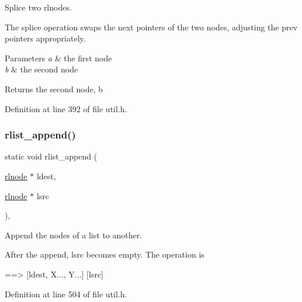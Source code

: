 Splice two rlnodes. 

The splice operation swaps the {\ttfamily next} pointers of the two nodes, adjusting the {\ttfamily prev} pointers appropriately.


\begin{DoxyParams}{Parameters}
{\em a} & the first node \\
\hline
{\em b} & the second node \\
\hline
\end{DoxyParams}
\begin{DoxyReturn}{Returns}
the second node, {\ttfamily b} 
\end{DoxyReturn}


Definition at line 392 of file util.\+h.

\mbox{\label{group__rlists_ga7f5989d7ec35645d6bbb1c15cd438532}} 
\subsubsection{\texorpdfstring{rlist\+\_\+append()}{rlist\_append()}}
{\footnotesize\ttfamily static void rlist\+\_\+append (\begin{DoxyParamCaption}\item[{\hyperlink{group__rlists_ga8f6244877f7ce2322c90525217ea6e7a}{rlnode} $\ast$}]{ldest,  }\item[{\hyperlink{group__rlists_ga8f6244877f7ce2322c90525217ea6e7a}{rlnode} $\ast$}]{lsrc }\end{DoxyParamCaption})\hspace{0.3cm}{\ttfamily [inline]}, {\ttfamily [static]}}



Append the nodes of a list to another. 

After the append, {\ttfamily lsrc} becomes empty. The operation is \begin{DoxyVerb}[ldest, X...] [lsrc, Y...]  ==> [ldest, X..., Y...]  [lsrc]
\end{DoxyVerb}
 

Definition at line 504 of file util.\+h.

\mbox{\label{group__rlists_gac02a33ca2f63b5dc5e9597a54da32cf4}} 
